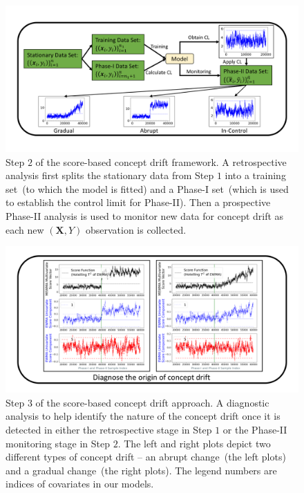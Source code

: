 \documentclass[twoside,11pt]{article}
\begin{document}
\begin{figure}
\centering
\includegraphics[width = 1\linewidth, trim=.35in .48in .35in .49in, clip]{../figures/v14/flow_chart/Monitoring_2.png}
\caption{Step $2$ of the score-based concept drift framework. A retrospective analysis first splits the stationary data from Step $1$ into a training set~(to which the model is fitted) and a Phase-I set~(which is used to establish the control limit for Phase-II). Then a prospective Phase-II analysis is used to monitor new data for concept drift as each new $(\bm{X}, Y)$ observation is collected.}
\label{fig:proc_mon_score_monitoring}
\end{figure}

\begin{figure}
\centering
\includegraphics[width = 1\linewidth, trim=.35in .21in .35in .21in, clip]{../figures/v14/flow_chart/Diagnose_2.png}
\caption{Step $3$ of the score-based concept drift approach. A diagnostic analysis to help identify the nature of the concept drift once it is detected in either the retrospective stage in Step $1$ or the Phase-II monitoring stage in Step $2$. The left and right plots depict two different types of concept drift -- an abrupt change~(the left plots) and a gradual change~(the right plots). The legend numbers are indices of covariates in our models.}
\label{fig:proc_mon_score_diagnosis}
\end{figure}
\end{document}
